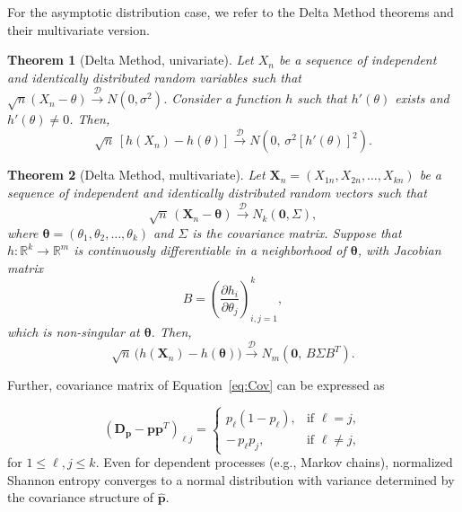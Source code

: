 For the asymptotic distribution case, we refer to the Delta Method theorems and their multivariate version.

\theoremstyle{plain}
\newtheorem{theorem}{Theorem}

\begin{theorem}[Delta Method, univariate]
	Let $X_n$ be a sequence of independent and identically distributed random variables such that 
	$\sqrt{n}(X_n - \theta) \xrightarrow{\mathscr{D}} N(0,\sigma^2)$. 
	Consider a function $h$ such that $h'(\theta)$ exists and $h'(\theta)\neq 0$. 
	Then,
	\[
	\sqrt{n}\,[h(X_n)-h(\theta)] \xrightarrow{\mathscr{D}} N\!\left(0,\,\sigma^2 [h'(\theta)]^2\right).
	\]
\end{theorem}

\begin{theorem}[Delta Method, multivariate]
	Let $\mathbf{X}_n= (X_{1n}, X_{2n}, \dots, X_{kn})$ be a sequence of independent and identically distributed random vectors such that 
	\[
	\sqrt{n}\,(\mathbf{X}_n - \boldsymbol{\theta}) \xrightarrow{\mathscr{D}} N_k(\mathbf{0},\Sigma),
	\]
	where $\boldsymbol{\theta} = (\theta_1,\theta_2,\dots,\theta_k)$ and $\Sigma$ is the covariance matrix. 
	Suppose that $h:\mathbb{R}^k \to \mathbb{R}^m$ is continuously differentiable in a neighborhood of $\boldsymbol{\theta}$, with Jacobian matrix
	\[
	B = \left( \frac{\partial h_i}{\partial \theta_j} \right)_{i,j=1}^k,
	\]
	which is non-singular at $\boldsymbol{\theta}$. Then,
	\[
	\sqrt{n}\,\big(h(\mathbf{X}_n)-h(\boldsymbol{\theta})\big) \xrightarrow{\mathscr{D}} N_m\!\left(\mathbf{0},\, B \Sigma B^T\right).
	\]
\end{theorem}

Further, covariance matrix of Equation~\ref{eq:Cov} can be expressed as 

\begin{equation}
	(\mathbf{D_p}-\mathbf{pp}^T)_{\ell j} =
	\begin{cases}
		p_{\ell}(1-p_{\ell}), & \text{if } \ell = j, \\[6pt]
		-\,p_{\ell}p_{j}, & \text{if } \ell \neq j,
	\end{cases}
\end{equation}
for $1\leq {\ell}, j\leq k.$
Even for dependent processes (e.g., Markov chains), normalized Shannon entropy converges to a normal distribution with variance determined by the covariance structure of $\widehat{\mathbf{p}}$. 


